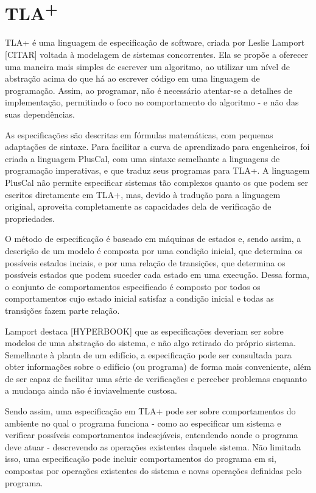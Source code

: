 \chapter{TLA\textsuperscript{+}}
\label{cap2}

TLA+ é uma linguagem de especificação de software, criada por Leslie Lamport [CITAR] voltada à modelagem de sistemas concorrentes. Ela se propõe a oferecer uma maneira mais simples de escrever um algoritmo, ao utilizar um nível de abstração acima do que há ao escrever código em uma linguagem de programação. Assim, ao programar, não é necessário atentar-se a detalhes de implementação, permitindo o foco no comportamento do algoritmo - e não das suas dependências.

As especificações são descritas em fórmulas matemáticas, com pequenas adaptações de sintaxe. Para facilitar a curva de aprendizado para engenheiros, foi criada a linguagem PlusCal, com uma sintaxe semelhante a linguagens de programação imperativas, e que traduz seus programas para TLA+. A linguagem PlusCal não permite especificar sistemas tão complexos quanto os que podem ser escritos diretamente em TLA+, mas, devido à tradução para a linguagem original, aproveita completamente as capacidades dela de verificação de propriedades.

O método de especificação é baseado em máquinas de estados e, sendo assim, a descrição de um modelo é composta por uma condição inicial, que determina os possíveis estados inciais, e por uma relação de transições, que determina os possíveis estados que podem suceder cada estado em uma execução. Dessa forma, o conjunto de comportamentos especificado é composto por todos os comportamentos cujo estado inicial satisfaz a condição inicial e todas as transições fazem parte relação.

Lamport destaca [HYPERBOOK] que as especificações deveriam ser sobre modelos de uma abstração do sistema, e não algo retirado do próprio sistema. Semelhante à planta de um edifício, a especificação pode ser consultada para obter informações sobre o edifício (ou programa) de forma mais conveniente, além de ser capaz de facilitar uma série de verificações e perceber problemas enquanto a mudança ainda não é inviavelmente custosa.

Sendo assim, uma especificação em TLA+ pode ser sobre comportamentos do ambiente no qual o programa funciona - como ao especificar um sistema e verificar possíveis comportamentos indesejáveis, entendendo aonde o programa deve atuar - descrevendo as operações existentes daquele sistema. Não limitada isso, uma especificação pode incluir  comportamentos do programa em si, compostas por operações existentes do sistema e novas operações definidas pelo programa.

